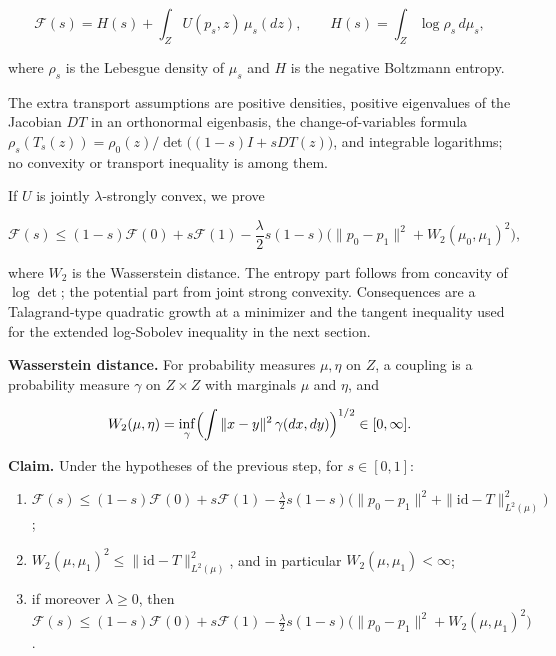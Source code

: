 \documentclass[11pt,a4paper]{report}
\begin{document}
\[\mathcal F(s)=H(s)+\int_ZU(p_s,z)\,\mu_s(dz),\qquad H(s)=\int_Z\log\rho_s\,d\mu_s,\]


where \(\rho_s\) is the Lebesgue density of \(\mu_s\) and \(H\) is the negative Boltzmann entropy.




The extra transport assumptions are positive densities, positive eigenvalues of the Jacobian \(DT\) in an orthonormal eigenbasis, the change-of-variables formula \(\rho_s(T_s(z))=\rho_0(z)/\det\bigl((1-s)I+sDT(z)\bigr)\), and integrable logarithms; no convexity or transport inequality is among them.




If \(U\) is jointly \(\lambda\)-strongly convex, we prove


\[\mathcal F(s)\le(1-s)\mathcal F(0)+s\mathcal F(1)-\frac\lambda2s(1-s)\bigl(\|p_0-p_1\|^2+W_2(\mu_0,\mu_1)^2\bigr),\]


where \(W_2\) is the Wasserstein distance. The entropy part follows from concavity of \(\log\det\); the potential part from joint strong convexity. Consequences are a Talagrand-type quadratic growth at a minimizer and the tangent inequality used for the extended log-Sobolev inequality in the next section.



\textbf{Wasserstein distance.} For probability measures \(\mu,\eta\) on \(Z\), a coupling is a probability measure \(\gamma\) on \(Z\times Z\) with marginals \(\mu\) and \(\eta\), and


\[W_2(\mu,\eta)=\inf_\gamma\Bigl(\int\|x-y\|^2\,\gamma(dx,dy)\Bigr)^{1/2}\in[0,\infty].\]


\textbf{Claim.} Under the hypotheses of the previous step, for \(s\in[0,1]\):



\begin{enumerate}


\item \(\mathcal F(s)\le(1-s)\mathcal F(0)+s\mathcal F(1)-\frac\lambda2s(1-s)\bigl(\|p_0-p_1\|^2+\|\mathrm{id}-T\|_{L^2(\mu)}^2\bigr)\);

\item \(W_2(\mu,\mu_1)^2\le\|\mathrm{id}-T\|_{L^2(\mu)}^2\), and in particular \(W_2(\mu,\mu_1)<\infty\);

\item if moreover \(\lambda\ge0\), then \(\mathcal F(s)\le(1-s)\mathcal F(0)+s\mathcal F(1)-\frac\lambda2s(1-s)\bigl(\|p_0-p_1\|^2+W_2(\mu,\mu_1)^2\bigr)\).

\end{enumerate}
\end{document}
